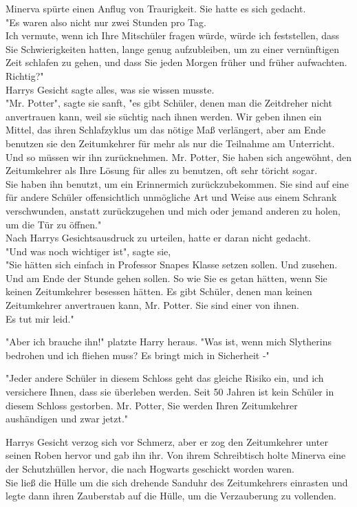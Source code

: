 {Minerva spürte einen Anflug von Traurigkeit. Sie hatte es sich gedacht.\\ "Es waren also nicht nur zwei Stunden pro Tag.\\ Ich vermute, wenn ich Ihre Mitschüler fragen würde, würde ich feststellen, dass Sie Schwierigkeiten hatten, lange genug aufzubleiben, um zu einer vernünftigen Zeit schlafen zu gehen, und dass Sie jeden Morgen früher und früher aufwachten. Richtig?"\\ Harrys Gesicht sagte alles, was sie wissen musste.\\ "Mr. Potter", sagte sie sanft, "es gibt Schüler, denen man die Zeitdreher nicht anvertrauen kann, weil sie süchtig nach ihnen werden. Wir geben ihnen ein Mittel, das ihren Schlafzyklus um das nötige Maß verlängert, aber am Ende benutzen sie den Zeitumkehrer für mehr als nur die Teilnahme am Unterricht.\\ Und so müssen wir ihn zurücknehmen. Mr. Potter, Sie haben sich angewöhnt, den Zeitumkehrer als Ihre Lösung für alles zu benutzen, oft sehr töricht sogar.\\ Sie haben ihn benutzt, um ein Erinnermich zurückzubekommen. Sie sind auf eine für andere Schüler offensichtlich unmögliche Art und Weise aus einem Schrank verschwunden, anstatt zurückzugehen und mich oder jemand anderen zu holen, um die Tür zu öffnen."\\ Nach Harrys Gesichtsausdruck zu urteilen, hatte er daran nicht gedacht.\\ "Und was noch wichtiger ist", sagte sie,\\ "Sie hätten sich einfach in Professor Snapes Klasse setzen sollen. Und zusehen. Und am Ende der Stunde gehen sollen. So wie Sie es getan hätten, wenn Sie keinen Zeitumkehrer besessen hätten. Es gibt Schüler, denen man keinen Zeitumkehrer anvertrauen kann, Mr. Potter. Sie sind einer von ihnen.\\ Es tut mir leid."

"Aber ich brauche ihn!" platzte Harry heraus. "Was ist, wenn mich Slytherins bedrohen und ich fliehen muss? Es bringt mich in Sicherheit -"

"Jeder andere Schüler in diesem Schloss geht das gleiche Risiko ein, und ich versichere Ihnen, dass sie überleben werden. Seit 50 Jahren ist kein Schüler in diesem Schloss gestorben. Mr. Potter, Sie werden Ihren Zeitumkehrer aushändigen und zwar jetzt."

Harrys Gesicht verzog sich vor Schmerz, aber er zog den Zeitumkehrer unter seinen Roben hervor und gab ihn ihr. Von ihrem Schreibtisch holte Minerva eine der Schutzhüllen hervor, die nach Hogwarts geschickt worden waren.\\ Sie ließ die Hülle um die sich drehende Sanduhr des Zeitumkehrers einrasten und legte dann ihren Zauberstab auf die Hülle, um die Verzauberung zu vollenden.

}
